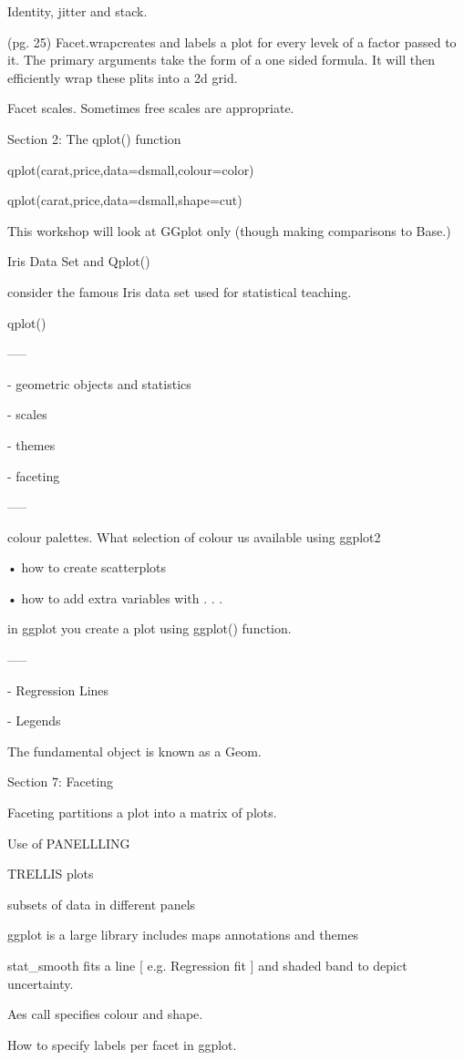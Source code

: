 Identity, jitter and stack.


(pg. 25) Facet.wrapcreates and labels a plot for every levek of a factor passed to it. The primary arguments take the form of a one sided formula. It will then efficiently wrap these plits into a 2d grid.

Facet scales. Sometimes free scales are appropriate.  

Section 2: The qplot() function









qplot(carat,price,data=dsmall,colour=color)

qplot(carat,price,data=dsmall,shape=cut)

 



This workshop will look at GGplot only (though making comparisons to Base.)

Iris Data Set and Qplot()


consider the famous Iris data set used for statistical teaching. 

qplot()

-----

- geometric objects and statistics

- scales

- themes

- faceting

-----

colour palettes. What selection of colour us available using ggplot2


•
how to create scatterplots 

•
how to add extra variables with . . .



in ggplot you create a plot using ggplot() function.

-----


 - Regression Lines

 - Legends


The fundamental object is known as a Geom.



 


Section 7: Faceting


 Faceting partitions a plot into a matrix of plots.

Use of PANELLLING

TRELLIS plots

subsets of data in different panels


ggplot is a large library includes maps annotations and themes


stat_smooth fits a line [ e.g. Regression fit ] and shaded band to depict uncertainty.


Aes call specifies colour and shape.


How to specify labels per facet in ggplot. 

